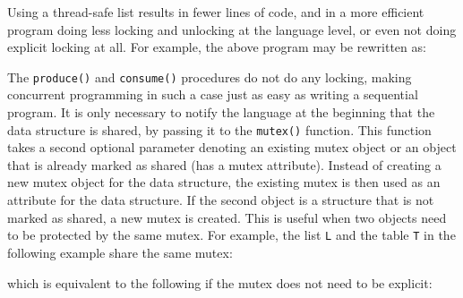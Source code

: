 Using a thread-safe list results in fewer lines of code, and in a more efficient
program doing less locking and unlocking at the language level, or even not
doing explicit locking at all. For example, the above program may be rewritten
as:


The \texttt{produce()} and \texttt{consume()} procedures do not do any locking,
making concurrent programming in such a case just as easy as writing a
sequential program. It is only necessary to notify the language at the beginning
that the data structure is shared, by passing it to the \texttt{mutex()}
function. This function takes a second optional parameter denoting an existing
mutex object or an object that is already marked as shared (has a mutex
attribute).  Instead of creating a new mutex object for the data structure, the
existing mutex is then used as an attribute for the data structure. If the second
object is a structure that is not marked as shared, a new mutex is created. This
is useful when two objects need to be protected by the same mutex. For example,
the list \texttt{L} and the table \texttt{T} in the following example share the
same mutex:


which is equivalent to the following if the mutex does not need to be explicit:


